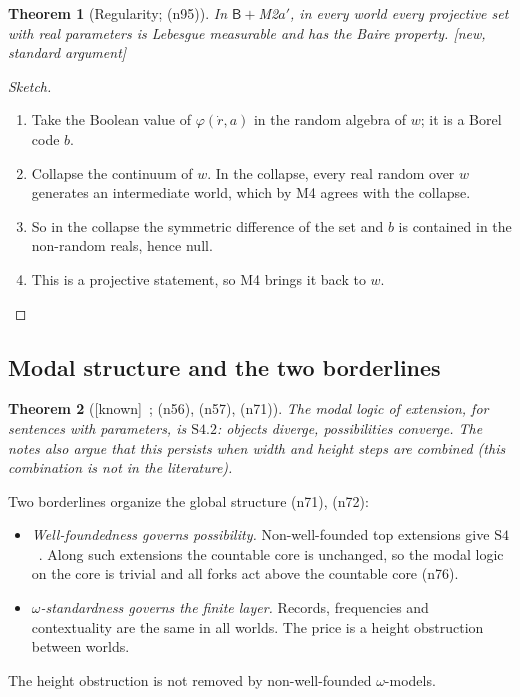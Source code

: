 \documentclass[11pt]{article}
\newtheorem{theorem}{Theorem}[section]
\theoremstyle{definition}
\theoremstyle{remark}
\newcommand{\B}{\mathsf{B}}
\newcommand{\status}[1]{\textsf{[#1]}}
\newcommand{\note}[1]{\textsf{(n#1)}}
\begin{document}
\begin{theorem}[Regularity; \note{95}]\label{thm:projmeas}
In $\B+$M2$a'$, in every world every projective set with real parameters is Lebesgue measurable and has the Baire property. \status{new, standard argument}
\end{theorem}
\begin{proof}[Sketch]
\begin{enumerate}
\item Take the Boolean value of $\varphi(\dot r,a)$ in the random algebra of $w$; it is a Borel code $b$.
\item Collapse the continuum of $w$. In the collapse, every real random over $w$ generates an intermediate world, which by M4 agrees with the collapse.
\item So in the collapse the symmetric difference of the set and $b$ is contained in the non-random reals, hence null.
\item This is a projective statement, so M4 brings it back to $w$.
\end{enumerate}
\end{proof}

\subsection{Modal structure and the two borderlines}

\begin{theorem}[\status{known}~\cite{HamkinsLowe08,HamkinsLinnebo,Hamkins12}; \note{56}, \note{57}, \note{71}]
The modal logic of extension, for sentences with parameters, is $\mathrm{S4.2}$: objects diverge, possibilities converge. The notes also argue that this persists when width and height steps are combined (this combination is not in the literature).
\end{theorem}

Two borderlines organize the global structure \note{71}, \note{72}:
\begin{itemize}
\item \emph{Well-foundedness governs possibility.} Non-well-founded top extensions give $\mathrm{S4}$~\cite{HamkinsWoodinUFS,HamkinsLinnebo}. Along such extensions the countable core is unchanged, so the modal logic on the core is trivial and all forks act above the countable core \note{76}.
\item \emph{$\omega$-standardness governs the finite layer.} Records, frequencies and contextuality are the same in all worlds. The price is a height obstruction between worlds.
\end{itemize}
The height obstruction is not removed by non-well-founded $\omega$-models.
\end{document}
